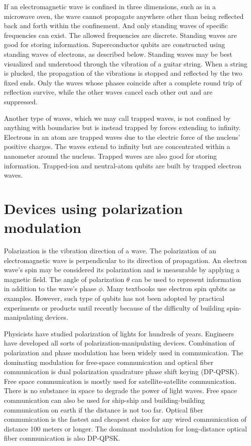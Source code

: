 \documentclass[oneside, letter, 12pt]{book}
\begin{document}
If an electromagnetic wave is confined in three dimensions, such as in a microwave oven, the wave cannot propagate anywhere other than being reflected back and forth within the confinement. And only standing waves of specific frequencies can exist. The allowed frequencies are discrete. Standing waves are good for storing information. Superconductor qubits are constructed using standing waves of electrons, as described below. Standing waves may be best visualized and understood through the vibration of a guitar string. When a string is plucked, the propagation of the vibrations is stopped and reflected by the two fixed ends. Only the waves whose phases coincide after a complete round trip of reflection survive, while the other waves cancel each other out and are suppressed.

Another type of waves, which we may call trapped waves, is not confined by anything with boundaries but is instead trapped by forces extending to infinity. Electrons in an atom are trapped waves due to the electric force of the nucleus' positive charges. The waves extend to infinity but are concentrated within a nanometer around the nucleus. Trapped waves are also good for storing information. Trapped-ion and neutral-atom qubits are built by trapped electron waves.

\section{Devices using polarization modulation}
Polarization is the vibration direction of a wave. The polarization of an electromagnetic wave is perpendicular to its direction of propagation. An electron wave's spin may be considered its polarization and is measurable by applying a magnetic field. The angle of polarization $\theta$ can be used to represent information in addition to the wave's phase $\phi$. Many textbooks use electron spin qubits as examples. However, such type of qubits has not been adopted by practical experiments or products until recently\cite{nanotube} because of the difficulty of building spin-manipulating devices.

Physicists have studied polarization of lights for hundreds of years. Engineers have developed all sorts of polarization-manipulating devices. Combination of polarization and phase modulation has been widely used in communication. The dominating modulation for free-space communication and optical fiber communication is dual polarization quadrature phase shift keying (DP-QPSK). Free space communication is mostly used for satellite-satellite communication. There is no substance in space to degrade the power of light waves. Free space communication can also be used for ship-ship and building-building communication on earth if the distance is not too far. Optical fiber communication is the fastest and cheapest choice for any wired communication of distance 100 meters or longer. The dominant modulation for long-distance optical fiber communication is also DP-QPSK.
\end{document}
